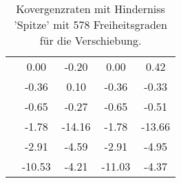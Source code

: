 \begin{table}
\begin{tabular}{c|cc|cc|}
\multicolumn{1}{|c|}{} & \multicolumn{1}{|c|}{      0.00} & \multicolumn{1}{|c|}{     -0.20} & \multicolumn{1}{|c|}{      0.00} & \multicolumn{1}{|c|}{      0.42} \\ 
\multicolumn{1}{|c|}{} & \multicolumn{1}{|c|}{     -0.36} & \multicolumn{1}{|c|}{      0.10} & \multicolumn{1}{|c|}{     -0.36} & \multicolumn{1}{|c|}{     -0.33} \\ 
\multicolumn{1}{|c|}{} & \multicolumn{1}{|c|}{     -0.65} & \multicolumn{1}{|c|}{     -0.27} & \multicolumn{1}{|c|}{     -0.65} & \multicolumn{1}{|c|}{     -0.51} \\ 
\multicolumn{1}{|c|}{} & \multicolumn{1}{|c|}{     -1.78} & \multicolumn{1}{|c|}{    -14.16} & \multicolumn{1}{|c|}{     -1.78} & \multicolumn{1}{|c|}{    -13.66} \\ 
\multicolumn{1}{|c|}{} & \multicolumn{1}{|c|}{     -2.91} & \multicolumn{1}{|c|}{     -4.59} & \multicolumn{1}{|c|}{     -2.91} & \multicolumn{1}{|c|}{     -4.95} \\ 
\multicolumn{1}{|c|}{} & \multicolumn{1}{|c|}{    -10.53} & \multicolumn{1}{|c|}{     -4.21} & \multicolumn{1}{|c|}{    -11.03} & \multicolumn{1}{|c|}{     -4.37} \\ 
\hline 
\end{tabular}\caption{Kovergenzraten mit Hinderniss 'Spitze' mit 578 Freiheitsgraden für die Verschiebung.}\label{tab:Rate_Spitze_level3}
\end{table} 
